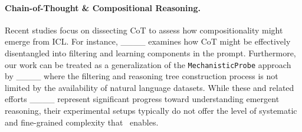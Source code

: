 \paragraph{Chain-of-Thought \& Compositional Reasoning.}
Recent studies focus on dissecting CoT to assess how compositionality might emerge from ICL. For instance, ____ examines how CoT might be effectively disentangled into filtering and learning components in the prompt. Furthermore, our work can be treated as a generalization of the \texttt{MechanisticProbe} approach by  ____ where the filtering and reasoning tree construction process is not limited by the availability of natural language datasets.  While these and related efforts ____ represent significant progress toward understanding emergent reasoning, their experimental setups typically do not offer the level of systematic and fine-grained complexity that \coticl~enables.

\bigskip


\vspace{-5mm}